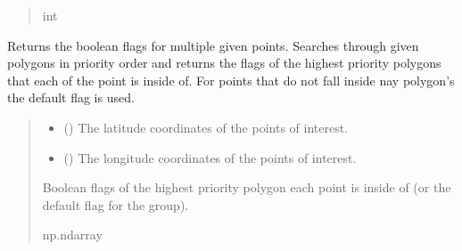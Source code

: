 \documentclass[letterpaper,10pt,english]{sphinxmanual}
\begin{document}
\begin{fulllineitems}
\begin{fulllineitems}
\begin{quote}
\begin{description}
\sphinxAtStartPar
int

\end{description}\end{quote}

\end{fulllineitems}


\begin{fulllineitems}
\label{\detokenize{modules/gps/zones:qnav.gps.zones.FlaggedPolygonGroup.get_point_flags}}
\pysigstartsignatures
{}
\pysigstopsignatures
\sphinxAtStartPar
Returns the boolean flags for multiple given points.
Searches through given polygons in priority order and returns the
flags of the highest priority polygons that each of the point is
inside of. For points that do not fall inside nay polygon’s the
default flag is used.
\begin{quote}\begin{description}
\begin{itemize}
\item {} 
\sphinxAtStartPar
{} () \textendash{} The latitude coordinates of the points of interest.

\item {} 
\sphinxAtStartPar
{} () \textendash{} The longitude coordinates of the points of interest.

\end{itemize}

\sphinxAtStartPar
Boolean flags of the highest priority polygon each point is
inside of (or the default flag for the group).

\sphinxAtStartPar
np.ndarray

\end{description}\end{quote}

\end{fulllineitems}


\end{fulllineitems}
\end{document}
